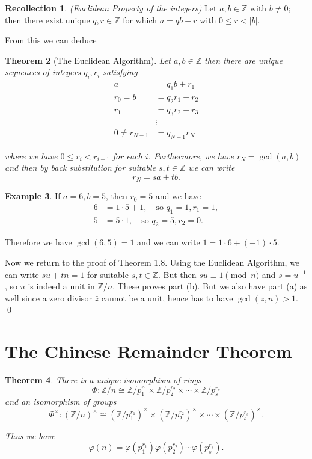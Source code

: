 \documentclass[11pt]{book}
\theoremstyle{plain}
\newtheorem{theorem}{Theorem}[chapter]
\theoremstyle{definition}
\newtheorem{example}[theorem]{Example}
\newtheorem{recollection}[theorem]{Recollection}
\begin{document}
\begin{recollection}
\emph{(Euclidean Property of the integers)} Let $a, b \in \mathbb{Z}$ with $b \neq 0$; then there exist unique $q, r \in \mathbb{Z}$ for which $a = qb + r$ with $0 \leq r < |b|$.
\end{recollection}

From this we can deduce

\begin{theorem}[The Euclidean Algorithm]
Let $a, b \in \mathbb{Z}$ then there are unique sequences of integers $q_i, r_i$ satisfying
\begin{align*}
a &= q_1 b + r_1 \\
r_0 = b &= q_2 r_1 + r_2 \\
r_1 &= q_3 r_2 + r_3 \\
&\vdots \\
0 \neq r_{N-1} &= q_{N+1} r_N
\end{align*}

where we have $0 \leq r_i < r_{i-1}$ for each $i$. Furthermore, we have $r_N = \gcd(a, b)$ and then by back substitution for suitable $s, t \in \mathbb{Z}$ we can write
\[
r_N = sa + tb.
\]
\end{theorem}

\begin{example}
If $a = 6, b = 5$, then $r_0 = 5$ and we have
\begin{align*}
6 &= 1 \cdot 5 + 1, \quad \text{so } q_1 = 1, r_1 = 1, \\
5 &= 5 \cdot 1, \quad \text{so } q_2 = 5, r_2 = 0.
\end{align*}

Therefore we have $\gcd(6, 5) = 1$ and we can write $1 = 1 \cdot 6 + (-1) \cdot 5$.
\end{example}

Now we return to the proof of Theorem 1.8. Using the Euclidean Algorithm, we can write $su + tn = 1$ for suitable $s, t \in \mathbb{Z}$. But then $su \equiv 1 \pmod{n}$ and $\bar{s} = \bar{u}^{-1}$, so $\bar{u}$ is indeed a unit in $\mathbb{Z}/n$. These proves part (b). But we also have part (a) as well since a zero divisor $\bar{z}$ cannot be a unit, hence has to have $\gcd(z, n) > 1$. \qed

\section{The Chinese Remainder Theorem}

\begin{theorem}
There is a unique isomorphism of rings
\[
\Phi : \mathbb{Z}/n \cong \mathbb{Z}/p_1^{r_1} \times \mathbb{Z}/p_2^{r_2} \times \cdots \times \mathbb{Z}/p_s^{r_s}
\]
and an isomorphism of groups
\[
\Phi^{\times} : (\mathbb{Z}/n)^{\times} \cong (\mathbb{Z}/p_1^{r_1})^{\times} \times (\mathbb{Z}/p_2^{r_2})^{\times} \times \cdots \times (\mathbb{Z}/p_s^{r_s})^{\times}.
\]

Thus we have
\[
\varphi(n) = \varphi(p_1^{r_1}) \varphi(p_2^{r_2}) \cdots \varphi(p_s^{r_s}).
\]
\end{theorem}
\end{document}

